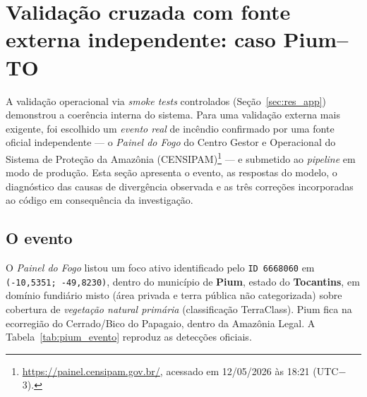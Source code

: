 %

\section{Validação cruzada com fonte externa independente: caso Pium--TO}
\label{sec:res_estudo_caso_pium}

A validação operacional via \emph{smoke tests} controlados (Seção~\ref{sec:res_app}) demonstrou a coerência interna do sistema. Para uma validação externa mais exigente, foi escolhido um \emph{evento real} de incêndio confirmado por uma fonte oficial independente --- o \emph{Painel do Fogo} do Centro Gestor e Operacional do Sistema de Proteção da Amazônia (CENSIPAM)\footnote{\url{https://painel.censipam.gov.br/}, acessado em 12/05/2026 às 18:21 (UTC$-$3).} --- e submetido ao \emph{pipeline} em modo de produção. Esta seção apresenta o evento, as respostas do modelo, o diagnóstico das causas de divergência observada e as três correções incorporadas ao código em consequência da investigação.

\subsection{O evento}
\label{subsec:pium_evento}

O \emph{Painel do Fogo} listou um foco ativo identificado pelo \texttt{ID 6668060} em \texttt{(-10{,}5351; -49{,}8230)}, dentro do município de \textbf{Pium}, estado do \textbf{Tocantins}, em domínio fundiário misto (área privada e terra pública não categorizada) sobre cobertura de \emph{vegetação natural primária} (classificação TerraClass). Pium fica na ecorregião do Cerrado/Bico do Papagaio, dentro da Amazônia Legal. A Tabela~\ref{tab:pium_evento} reproduz as detecções oficiais.

